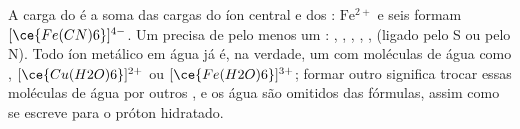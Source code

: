 A carga do  é a soma das cargas do íon central e dos :
$\mathrm{Fe^{2+}}$ e seis  formam
$[\ce{Fe(CN)6}]^{4-}$. Um  precisa de pelo menos um : , , , , , 
(ligado pelo S ou pelo N). Todo íon metálico em água já é, na verdade,
um  com moléculas de água como ,
$[\ce{Cu(H2O)6}]^{2+}$ ou $[\ce{Fe(H2O)6}]^{3+}$; formar outro 
significa trocar essas moléculas de água por outros , e os
 água são omitidos das fórmulas, assim como se escreve 
para o próton hidratado.
